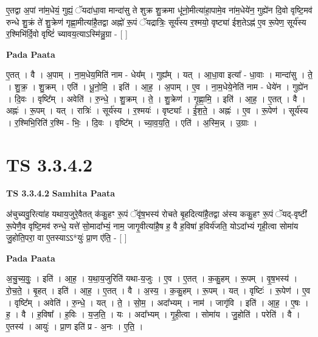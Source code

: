 \documentclass[17pt]{extarticle}
\begin{document}
ए॒तद्वा अ॒पां ना॑म॒धेयं॒ गुह्यं॒ ॅयदा॑धा॒वा मान्दा॑सु ते शुक्र शु॒क्रमा धू॑नो॒मीत्या॑हा॒पामे॒व ना॑म॒धेये॑न॒ गुह्ये॑न दि॒वो वृष्टि॒मव॑ रुन्धे शु॒क्रं ते॑ शु॒क्रेण॑ गृह्णा॒मीत्या॑है॒तद्वा अह्नो॑ रू॒पं ॅयद्रात्रिः॒ सूर्य॑स्य र॒श्मयो॒ वृष्ट्या॑ ईश॒तेऽह्न॑ ए॒व रू॒पेण॒ सूर्य॑स्य र॒श्मिभि॑र्दि॒वो वृष्टिं॑ च्यावय॒त्याऽस्मि॑न्नु॒ग्रा - [  ] \newline

\textbf{Pada Paata} \newline

ए॒तत् । वै । अ॒पाम् । ना॒म॒धेय॒मिति॑ नाम - धेय᳚म् । गुह्य᳚म् । यत् । आ॒धा॒वा इत्या᳚ - धा॒वाः । मान्दा॑सु । ते॒ । शु॒क्र॒ । शु॒क्रम् । एति॑ । धू॒नो॒मि॒ । इति॑ । आ॒ह॒ । अ॒पाम् । ए॒व । ना॒म॒धेये॒नेति॑ नाम - धेये॑न । गुह्ये॑न । दि॒वः । वृष्टि᳚म् । अवेति॑ । रु॒न्धे॒ । शु॒क्रम् । ते॒ । शु॒क्रेण॑ । गृ॒ह्णा॒मि॒ । इति॑ । आ॒ह॒ । ए॒तत् । वै । अह्नः॑ । रू॒पम् । यत् । रात्रिः॑ । सूर्य॑स्य । र॒श्मयः॑ । वृष्ट्याः᳚ । ई॒श॒ते॒ । अह्नः॑ । ए॒व । रू॒पेण॑ । सूर्य॑स्य । र॒श्मिभि॒रिति॑ र॒श्मि - भिः॒ । दि॒वः । वृष्टि᳚म् । च्या॒व॒य॒ति॒ । एति॑ । अ॒स्मि॒न्न् । उ॒ग्राः ।  \newline




\section*{ TS 3.3.4.2 }

\textbf{TS 3.3.4.2 } \newline
\textbf{Samhita Paata} \newline

अ॑चुच्यवु॒रित्या॑ह यथाय॒जुरे॒वैतत् क॑कु॒हꣳ रू॒पं ॅवृ॑ष॒भस्य॑ रोचते बृ॒हदित्या॑है॒तद्वा अ॑स्य ककु॒हꣳ रू॒पं ॅयद्-वृष्टी॑ रू॒पेणै॒व वृष्टि॒मव॑ रुन्धे॒ यत्ते॑ सो॒मादा᳚भ्यं॒ नाम॒ जागृ॒वीत्या॑है॒ष ह॒ वै ह॒विषा॑ ह॒विर्य॑जति॒ योऽदा᳚भ्यं गृही॒त्वा सोमा॑य जु॒होति॒परा॒ वा ए॒तस्याऽऽ*युः॑ प्रा॒ण ए॑ति॒ - [  ] \newline

\textbf{Pada Paata} \newline

अ॒चु॒च्य॒वुः॒ । इति॑ । आ॒ह॒ । य॒था॒य॒जुरिति॑ यथा-य॒जुः । ए॒व । ए॒तत् । क॒कु॒हम् । रू॒पम् । वृ॒ष॒भस्य॑ । रो॒च॒ते॒ । बृ॒हत् । इति॑ । आ॒ह॒ । ए॒तत् । वै । अ॒स्य॒ । क॒कु॒हम् । रू॒पम् । यत् । वृष्टिः॑ । रू॒पेण॑ । ए॒व । वृष्टि᳚म् । अवेति॑ । रु॒न्धे॒ । यत् । ते॒ । सो॒म॒ । अदा᳚भ्यम् । नाम॑ । जागृ॑वि । इति॑ । आ॒ह॒ । ए॒षः । ह॒ । वै । ह॒विषा᳚ । ह॒विः । य॒ज॒ति॒ । यः । अदा᳚भ्यम् । गृ॒ही॒त्वा । सोमा॑य । जु॒होति॑ । परेति॑ । वै । ए॒तस्य॑ । आयुः॑ । प्रा॒ण इति॑ प्र - अ॒नः । ए॒ति॒ ।  \newline
\end{document}
